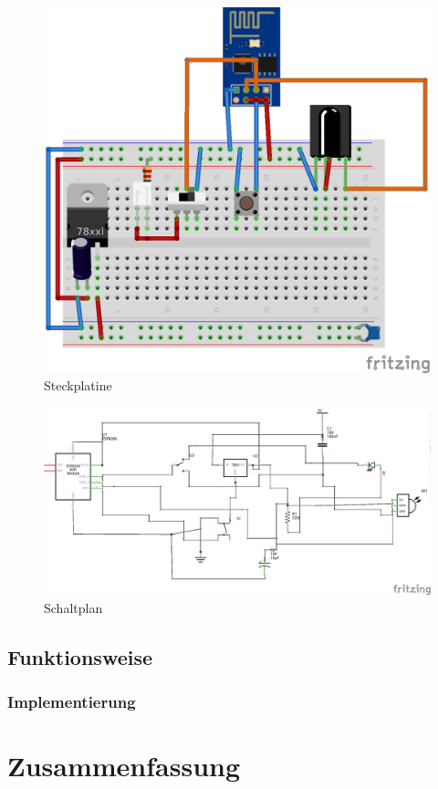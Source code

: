 \begin{figure}
	\centering
	\includegraphics[scale=1]{Abbildungen/ESP8266_Steckplatine}
	\caption{Steckplatine}
\end{figure}

\begin{figure}
	\centering
	\includegraphics[scale=1]{Abbildungen/ESP8266_Schaltplan}
	\caption{Schaltplan}
\end{figure}


\subsection{Funktionsweise}
\subsubsection{Implementierung}
\section{Zusammenfassung}

\pagestyle{empty}										%
